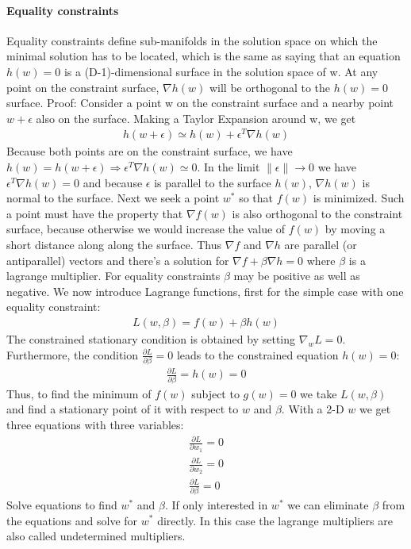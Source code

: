 \documentclass[main]{subfiles}
\begin{document}
\paragraph{Equality constraints}
Equality constraints define sub-manifolds in the solution space on which the minimal solution has to be located, which is the same as saying that an equation $h(w)=0$ is a (D-1)-dimensional surface in the solution space of w.
At any point on the constraint surface, $\nabla h(w)$ will be orthogonal to the $h(w)=0$ surface. 
\newline
Proof: Consider a point w on the constraint surface and a nearby point $w+\epsilon$ also on the surface. Making a Taylor Expansion around w, we get
\begin{align}
h(w+\epsilon) \simeq h(w)+\epsilon^T \nabla h(w)
\end{align}
Because both points are on the constraint surface, we have $h(w)=h(w+\epsilon) \Rightarrow \epsilon^T \nabla h(w) \simeq 0$. In the limit $\parallel \epsilon \parallel \rightarrow 0$ we have $\epsilon^T \nabla h(w) = 0$ and because $\epsilon$ is parallel to the surface $h(w)$, $\nabla h(w)$ is normal to the surface. \newline
Next we seek a point $w^*$ so that $f(w)$ is minimized. Such a point must have the property that $\nabla f(w)$ is also orthogonal to the constraint surface, because otherwise we would increase the value of $f(w)$ by moving a short distance along along the surface. Thus $\nabla f$ and $\nabla h$ are parallel (or antiparallel) vectors and there's a solution for $\nabla f + \beta \nabla h = 0$ where $\beta$ is a lagrange multiplier. 
\newline
For equality constraints $\beta$ may be positive as well as negative. We now introduce Lagrange functions, first for the simple case with one equality constraint:
\begin{align}
L(w,\beta)=f(w)+\beta h(w)
\end{align}
The constrained stationary condition is obtained by setting $\nabla_w L=0$. Furthermore, the condition $\frac{\partial L}{\partial \beta} = 0$ leads to the constrained equation $h(w)=0$:
\begin{align}
\frac{\partial L}{\partial \beta}=h(w)=0
\end{align}
Thus, to find the minimum of $f(w)$ subject to $g(w)=0$ we take $L(w,\beta)$ and find a stationary point of it with respect to $w$ and $\beta$.
\newline
With a 2-D $w$ we get three equations with three variables:
\begin{align}
\frac{\partial L}{\partial w_1}=0 \\
\frac{\partial L}{\partial w_2}=0 \\
\frac{\partial L}{\partial \beta}=0
\end{align}
Solve equations to find $w^*$ and $\beta$. If only interested in $w^*$ we can eliminate $\beta$ from the equations and solve for $w^*$ directly. In this case the lagrange multipliers are also called undetermined multipliers.
\end{document}
